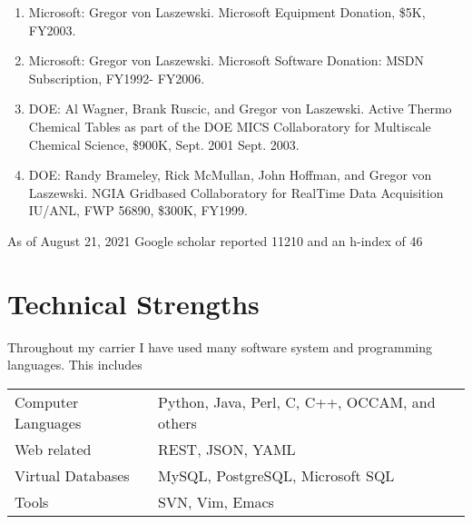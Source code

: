 \documentclass{article}
\begin{document}
\begin{enumerate}
\item  Microsoft: Gregor von Laszewski. Microsoft Equipment Donation, \$5K, FY2003. 
\item  Microsoft: Gregor von Laszewski. Microsoft Software Donation: MSDN Subscription, FY1992- FY2006. 
\item  DOE: Al Wagner, Brank Ruscic, and Gregor von Laszewski. Active Thermo Chemical Tables as part of the DOE MICS Collaboratory for Multiscale Chemical Science, \$900K, Sept. 2001 Sept. 2003. 
\item  DOE: Randy Brameley, Rick McMullan, John Hoffman, and Gregor von Laszewski. NGIA Gridbased Collaboratory for RealTime Data Acquisition IU/ANL, FWP 56890, \$300K, FY1999.

\end{enumerate} 


As of August 21, 2021 Google scholar reported 11210 and an h-index of 46



\section{Technical Strengths}

Throughout my carrier I have used many software system and programming languages. This includes

\bigskip

\begin{tabular}{ll}
Computer Languages & Python, Java, Perl, C, C++, OCCAM, and others\\
Web related & REST, JSON, YAML \\
Virtual 
Databases & MySQL, PostgreSQL, Microsoft SQL \\
Tools & SVN, Vim, Emacs
\end{tabular}



\end{document}
